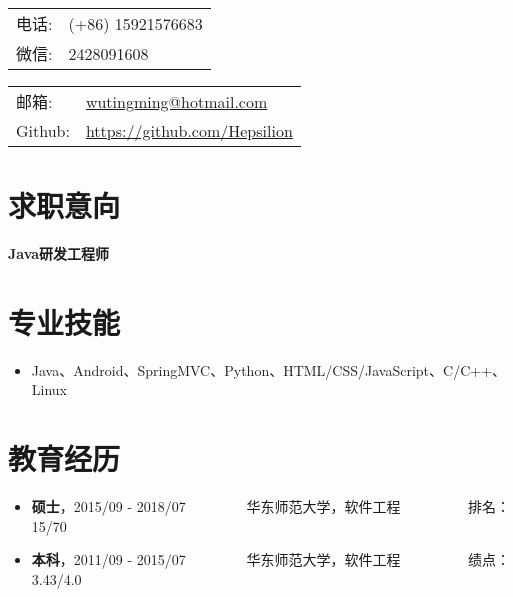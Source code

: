 \documentclass[letterpaper, UTF8, 11pt]{article}
\def\name{\textbf{\textcolor[rgb]{0.00, 0.00, 0.00}{\fontsize{30pt}{30pt}吴庭明}} ~~~~~~~~~ \fontsize{15pt}{15pt}}
\begin{document}
	
	\noindent{\bf \name} 
	\vspace{0.1in}

	\begin{minipage}{0.45\linewidth}
		\begin{tabular}{ll}
			电话:   & (+86) 15921576683 \\
			微信:   & 2428091608 \\
		\end{tabular}
	\end{minipage}
	\begin{minipage}{0.45\linewidth}
		\begin{tabular}{ll}
			邮箱:   & \href{mailto:wutingming@hotmail.com}{ wutingming@hotmail.com} \\
			Github: & \href{https://github.com/Hepsilion}{https://github.com/Hepsilion}\\
		\end{tabular}
	\end{minipage}
	\vspace{-0.1in}
	
	\section*{\textbf{求职意向}}\vspace{-0.15in}
		\textbf{Java研发工程师}
	\vspace{-0.25in}
	
	\section*{\textbf{专业技能}}\vspace{-0.15in}
	\begin{itemize}
		\item Java、Android、SpringMVC、Python、HTML/CSS/JavaScript、C/C++、Linux
	\end{itemize}
	\vspace{-0.32in}
	
	\section*{\textbf{教育经历}}\vspace{-0.15in}
	\begin{itemize}
		\item \textbf{硕士}，2015/09 - 2018/07 ~~~~~~~~华东师范大学，软件工程  ~~~~~~~~~排名：15/70
		\item \textbf{本科}，2011/09 - 2015/07 ~~~~~~~~华东师范大学，软件工程  ~~~~~~~~~绩点：3.43/4.0
	\end{itemize}
	\vspace{-0.32in}
	
\end{document}
